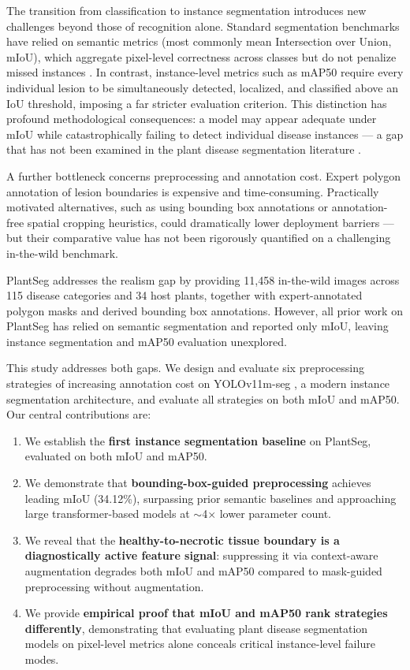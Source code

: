 \documentclass[preprint,12pt]{elsarticle}
\begin{document}
The transition from classification to instance segmentation introduces new challenges beyond those of recognition alone. Standard segmentation benchmarks have relied on semantic metrics (most commonly mean Intersection over Union, mIoU), which aggregate pixel-level correctness across classes but do not penalize missed instances \citep{garcia2017review}. In contrast, instance-level metrics such as mAP50 require every individual lesion to be simultaneously detected, localized, and classified above an IoU threshold, imposing a far stricter evaluation criterion. This distinction has profound methodological consequences: a model may appear adequate under mIoU while catastrophically failing to detect individual disease instances --- a gap that has not been examined in the plant disease segmentation literature \citep{rethink2021segeval}.

A further bottleneck concerns preprocessing and annotation cost. Expert polygon annotation of lesion boundaries is expensive and time-consuming. Practically motivated alternatives, such as using bounding box annotations or annotation-free spatial cropping heuristics, could dramatically lower deployment barriers --- but their comparative value has not been rigorously quantified on a challenging in-the-wild benchmark.

PlantSeg \citep{plantseg2024} addresses the realism gap by providing 11,458 in-the-wild images across 115 disease categories and 34 host plants, together with expert-annotated polygon masks and derived bounding box annotations. However, all prior work on PlantSeg has relied on semantic segmentation and reported only mIoU, leaving instance segmentation and mAP50 evaluation unexplored.

This study addresses both gaps. We design and evaluate six preprocessing strategies of increasing annotation cost on YOLOv11m-seg \citep{yolov11_2024}, a modern instance segmentation architecture, and evaluate all strategies on both mIoU and mAP50. Our central contributions are:

\begin{enumerate}
    \item We establish the \textbf{first instance segmentation baseline} on PlantSeg, evaluated on both mIoU and mAP50.
    \item We demonstrate that \textbf{bounding-box-guided preprocessing} achieves leading mIoU (34.12\%), surpassing prior semantic baselines and approaching large transformer-based models at $\sim$4$\times$ lower parameter count.
    \item We reveal that the \textbf{healthy-to-necrotic tissue boundary is a diagnostically active feature signal}: suppressing it via context-aware augmentation degrades both mIoU and mAP50 compared to mask-guided preprocessing without augmentation.
    \item We provide \textbf{empirical proof that mIoU and mAP50 rank strategies differently}, demonstrating that evaluating plant disease segmentation models on pixel-level metrics alone conceals critical instance-level failure modes.
\end{enumerate}
\end{document}
